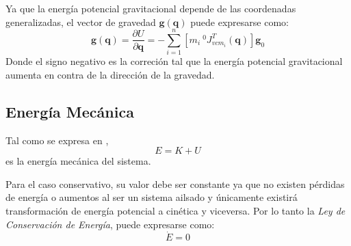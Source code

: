     Ya que la energía potencial gravitacional depende de las coordenadas generalizadas, el vector de gravedad $\boldsymbol{g}(\boldsymbol{q})$ puede
    expresarse como:
    \begin{equation}
        \label{eqn:vector_gravedad}
        \boldsymbol{g}(\boldsymbol{q}) = \frac{\partial U}{\partial \boldsymbol{q}}=-\sum_{i=1}^n \left[m_i \: ^0J_{v{cm_i}}^T(\boldsymbol{q}) \right] \boldsymbol{g}_0
    \end{equation}
    Donde el signo negativo es la correción tal que la energía potencial gravitacional aumenta en contra de la dirección de la gravedad.

    \subsection{Energía Mecánica} 
    Tal como se expresa en \cite{theoretical_minimun},
    \begin{equation}
        \label{eqn:energia_mecanica}
         E = K + U
    \end{equation}
    es la energía mecánica del sistema.
    
    Para el caso conservativo, su valor debe ser constante ya que no existen pérdidas de energía o aumentos al ser un sistema ailsado y
    únicamente existirá transformación de energía potencial a cinética y viceversa. Por lo tanto la \emph{Ley de Conservación de Energía},
    puede expresarse como: 
    \begin{equation}
        \label{eqn:derivada_energia_mecanica}
         \dot{E} = 0
    \end{equation}